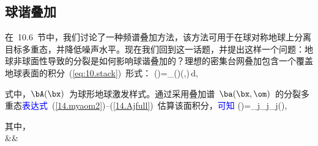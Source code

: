 \subsection{球谐叠加}
%
\renewcommand{\thesubsection}{\arabic{chapter}.\arabic{section}.\arabic{subsection}}

在~10.6~节中，我们讨论了一种频谱叠加方法，该方法可用于在球对称地球上分离目标多重态，并降低噪声水平。现在我们回到这一话题，并提出这样一个问题：地球非球面性导致的分裂是如何影响球谐叠加的？理想的密集台网叠加包含一个覆盖地球表面的积分~(\ref{eq:10.stack})~形式：
\eq \label{14.asphericalstack}
\Sigma(\om)=\int_\Omega\bA(\bx)\cdot\ba(\bx,\om)\,d\Omega,
\en

式中，$\bA(\bx)$~为球形地球激发样式。通过采用叠加谱~$\ba(\bx,\om)$~的分裂多重态\textcolor{blue}{表达式}~(\ref{14.myaom2})--(\ref{14.Ajfull})~估算该面积分，\textcolor{blue}{可知}
\eq \label{14.stack}
\Sigma(\om)=\sum_j\sA_j\eta_j(\om),
\en

其中，
\eqa \label{14.Ajstack}  \nonumber \\
&&\mbox{}
\ena

